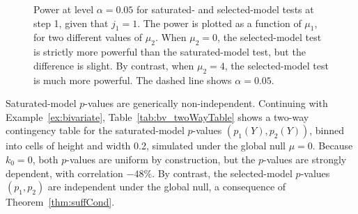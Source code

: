 \documentclass{article}
\begin{document}
\begin{figure}
\begin{subfigure}[t]{.4\textwidth}
  \end{subfigure}
  \caption{Power at level $\alpha=0.05$ for saturated- and selected-model tests at step 1, given that $j_1=1$. The power is plotted as a function of $\mu_1$, for two different values of $\mu_2$. When $\mu_2=0$, the selected-model test is strictly more powerful than the saturated-model test, but the difference is slight. By contrast, when $\mu_2=4$, the selected-model test is much more powerful. The dashed line shows $\alpha=0.05$.}
   \label{fig:bv_powCurves}
\end{figure}

Saturated-model $p$-values are generically non-independent. Continuing with Example~\ref{ex:bivariate}, Table~\ref{tab:bv_twoWayTable} shows a two-way contingency table for the saturated-model $p$-values $(p_1(Y), p_2(Y))$, binned into cells of height and width 0.2, simulated under the global null $\mu=0$. Because $k_0=0$, both $p$-values are uniform by construction, but the $p$-values are strongly dependent, with correlation $-48\%$. By contrast, the selected-model $p$-values $(p_1,p_2)$ are independent under the global null, a consequence of Theorem~\ref{thm:suffCond}.

\end{document}
